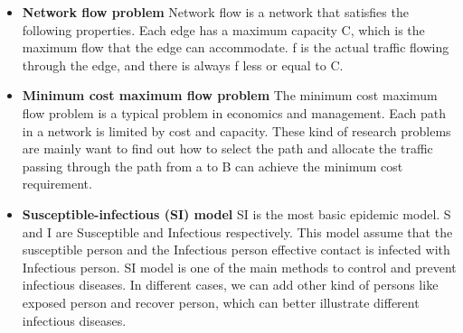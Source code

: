\begin{itemize}
    \item \textbf{Network flow problem}
    Network flow is a network that satisfies the following properties. Each edge has a maximum capacity C, which is the maximum flow that the edge can accommodate. f is the actual traffic flowing through the edge, and there is always f less or equal to C.
    \item \textbf{Minimum cost maximum flow problem}
The minimum cost maximum flow problem is a typical problem in economics and management. Each path in a network is limited by cost and capacity. These kind of research problems are mainly want to find out how to select the path and allocate the traffic passing through the path from a to B can achieve the minimum cost requirement.
    \item \textbf{Susceptible-infectious (SI) model }
    SI is the most basic epidemic model. S and I are Susceptible and Infectious respectively. This model assume that the susceptible person and the Infectious person effective contact is infected with Infectious person. SI model is one of the main methods to control and prevent infectious diseases. In different cases, we can add other kind of persons like exposed person and recover person, which can better illustrate different infectious diseases.

\end{itemize}